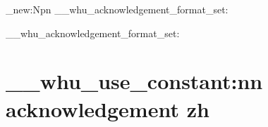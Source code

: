 

\cs_new:Npn \__whu_acknowledgement_format_set: { }
 {}
  {
    \__whu_acknowledgement_format_set:
    \chapter
      [ \__whu_use_constant:nn { acknowledgement } { zh-toc } ]
      { \__whu_use_constant:nn { acknowledgement } { zh } }
  }
  {}